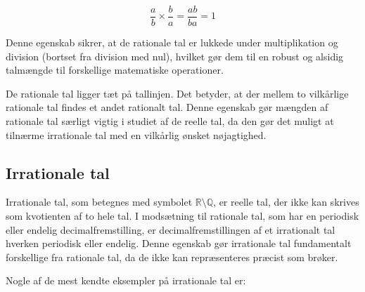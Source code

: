 \[
\frac{a}{b} \times \frac{b}{a} = \frac{ab}{ba} = 1
\]

Denne egenskab sikrer, at de rationale tal er lukkede under multiplikation og division (bortset fra division med nul), hvilket gør dem til en robust og alsidig talmængde til forskellige matematiske operationer.

De rationale tal ligger tæt på tallinjen. Det betyder, at der mellem to vilkårlige rationale tal findes et andet rationalt tal. Denne egenskab gør mængden af rationale tal særligt vigtig i studiet af de reelle tal, da den gør det muligt at tilnærme irrationale tal med en vilkårlig ønsket nøjagtighed.

\subsection*{Irrationale tal}
Irrationale tal, som betegnes med symbolet $\mathbb{R} \setminus \mathbb{Q}$, er reelle tal, der ikke kan skrives som kvotienten af to hele tal. I modsætning til rationale tal, som har en periodisk eller endelig decimalfremstilling, er decimalfremstillingen af et irrationalt tal hverken periodisk eller endelig. Denne egenskab gør irrationale tal fundamentalt forskellige fra rationale tal, da de ikke kan repræsenteres præcist som brøker.

Nogle af de mest kendte eksempler på irrationale tal er:

